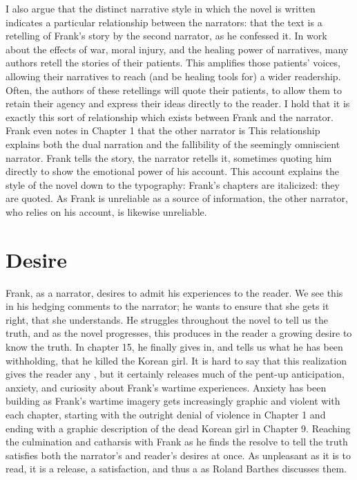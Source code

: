 \documentclass[12pt]{article}
\begin{document}
I also argue that the distinct narrative style in which the novel is written
indicates a particular relationship between the narrators: that the text is a
retelling of Frank's story by the second narrator, as he confessed it. In work
about the effects of war, moral injury, and the healing power of narratives,
many authors retell the stories of their
patients.\autocite{Shay95,vanDernoot09,Brock15,Charon06} This amplifies those
patients' voices, allowing their narratives to reach (and be healing tools for)
a wider readership. Often, the authors of these retellings will quote their
patients, to allow them to retain their agency and express their ideas directly
to the reader. I hold that it is exactly this sort of relationship which exists
between Frank and the narrator. Frank even notes in Chapter 1 that the other
narrator is \autocite[p.~6]{Morrison12} This
relationship explains both the dual narration and the fallibility of the
seemingly omniscient narrator. Frank tells the story, the narrator retells it,
sometimes quoting him directly to show the emotional power of his account. This
account explains the style of the novel down to the typography: Frank's
chapters are italicized: they are quoted. As Frank is unreliable as a source of
information, the other narrator, who relies on his account, is likewise
unreliable.

\section{Desire}

Frank, as a narrator, desires to admit his experiences to the reader. We see
this in his hedging comments to the narrator; he wants to ensure that she gets
it right, that she understands.\autocite[p.~6,~42,~70,~84]{Morrison12} He
struggles throughout the novel to tell us the truth, and as the novel
progresses, this produces in the reader a growing desire to know the truth. In
chapter 15,\autocite[p.~133]{Morrison12} he finally gives in, and tells us what
he has been withholding, that he killed the Korean girl. It is hard to say that
this realization gives the reader any , but it certainly releases
much of the pent-up anticipation, anxiety, and curiosity about Frank's wartime
experiences. Anxiety has been building as Frank's wartime imagery gets
increasingly graphic and violent with each chapter, starting with the outright
denial of violence in Chapter 1 and ending with a graphic description of the
dead Korean girl in Chapter 9.\autocite[Ch.~1,~3,~5,~7,~9]{Morrison12}
Reaching the culmination and catharsis with Frank as he finds the resolve to
tell the truth satisfies both the narrator's and reader's desires at once. As
unpleasant as it is to read, it is a release, a satisfaction, and thus a
 as Roland Barthes discusses them.\autocite[p.
124]{Charon06}
\end{document}
